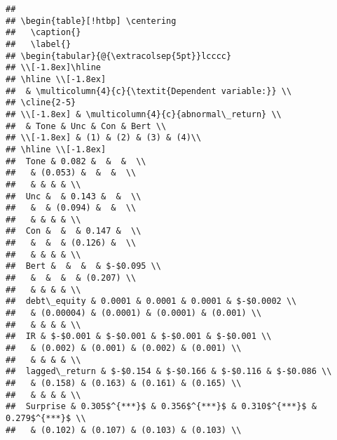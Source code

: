 \documentclass[
]{article}
\begin{document}
\begin{verbatim}
## 
## \begin{table}[!htbp] \centering 
##   \caption{} 
##   \label{} 
## \begin{tabular}{@{\extracolsep{5pt}}lcccc} 
## \\[-1.8ex]\hline 
## \hline \\[-1.8ex] 
##  & \multicolumn{4}{c}{\textit{Dependent variable:}} \\ 
## \cline{2-5} 
## \\[-1.8ex] & \multicolumn{4}{c}{abnormal\_return} \\ 
##  & Tone & Unc & Con & Bert \\ 
## \\[-1.8ex] & (1) & (2) & (3) & (4)\\ 
## \hline \\[-1.8ex] 
##  Tone & 0.082 &  &  &  \\ 
##   & (0.053) &  &  &  \\ 
##   & & & & \\ 
##  Unc &  & 0.143 &  &  \\ 
##   &  & (0.094) &  &  \\ 
##   & & & & \\ 
##  Con &  &  & 0.147 &  \\ 
##   &  &  & (0.126) &  \\ 
##   & & & & \\ 
##  Bert &  &  &  & $-$0.095 \\ 
##   &  &  &  & (0.207) \\ 
##   & & & & \\ 
##  debt\_equity & 0.0001 & 0.0001 & 0.0001 & $-$0.0002 \\ 
##   & (0.00004) & (0.0001) & (0.0001) & (0.001) \\ 
##   & & & & \\ 
##  IR & $-$0.001 & $-$0.001 & $-$0.001 & $-$0.001 \\ 
##   & (0.002) & (0.001) & (0.002) & (0.001) \\ 
##   & & & & \\ 
##  lagged\_return & $-$0.154 & $-$0.166 & $-$0.116 & $-$0.086 \\ 
##   & (0.158) & (0.163) & (0.161) & (0.165) \\ 
##   & & & & \\ 
##  Surprise & 0.305$^{***}$ & 0.356$^{***}$ & 0.310$^{***}$ & 0.279$^{***}$ \\ 
##   & (0.102) & (0.107) & (0.103) & (0.103) \\ 

\end{verbatim}
\end{document}
